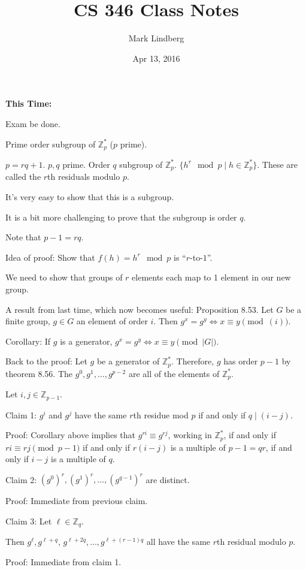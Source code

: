 \documentclass[12pt]{article}
\newcommand{\Z}{\mathbb{Z}}
\begin{document}
\title{CS 346 Class Notes}
\date{Apr 13, 2016}
\author{Mark Lindberg}
\maketitle
\thispagestyle{fancy}

{\bf This Time:}

Exam be done.

Prime order subgroup of $\Z_p^*$ ($p$ prime).

$p=rq+1$. $p,q$ prime. Order $q$ subgroup of $\Z_p^*$. $\{h^r\mod{p}\mid h\in\Z_p^*\}$. These are called the $r$th residuals modulo $p$.

It's very easy to show that this is a subgroup.

It is a bit more challenging to prove that the subgroup is order $q$.

Note that $p-1=rq$.

Idea of proof: Show that $f(h)=h^r\mod{p}$ is ``$r$-to-$1$''.

We need to show that groups of $r$ elements each map to 1 element in our new group.

A result from last time, which now becomes useful: Proposition 8.53. Let $G$ be a finite group, $g\in G$ an element of order $i$. Then $g^x=g^y\Leftrightarrow x\equiv y\pmod(i)$.

Corollary: If $g$ is a generator, $g^x=g^y\Leftrightarrow x\equiv y\pmod{|G|}$.

Back to the proof: Let $g$ be a generator of $\Z_p^*$. Therefore, $g$ has order $p-1$ by theorem 8.56. The $g^0,g^1,\dots,g^{p-2}$ are all of the elements of $\Z_p^*$.

Let $i,j\in\Z_{p-1}$.

Claim 1: $g^i$ and $g^j$ have the same $r$th residue mod $p$ if and only if $q\mid(i-j)$.

Proof: Corollary above implies that $g^{ri}\equiv g^{rj}$, working in $\Z_p^*$, if and only if $ri\equiv rj\pmod{p-1}$ if and only if $r(i-j)$ is a multiple of $p-1=qr$, if and only if $i-j$ is a multiple of $q$.

Claim 2: $(g^0)^r,(g^1)^r,\dots,(g^{q-1})^r$ are distinct.

Proof: Immediate from previous claim.

Claim 3: Let $\ell\in\Z_q$.

Then $g^{\ell}, g^{\ell+q}$, $g^{\ell+2q},\dots,g^{\ell+(r-1)q}$ all have the same $r$th residual modulo $p$.

Proof: Immediate from claim 1.
\end{document}
